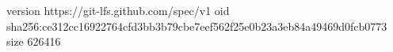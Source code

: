 version https://git-lfs.github.com/spec/v1
oid sha256:ce312cc16922764cfd3bb3b79cbe7eef562f25e0b23a3eb84a49469d0fcb0773
size 626416

